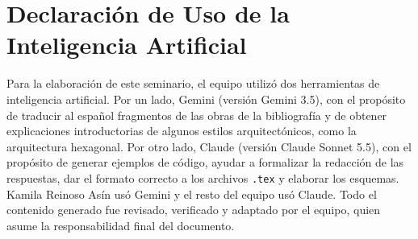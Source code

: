 \documentclass[12pt,a4paper]{article}
\begin{document}
\newpage
\printbibliography[title={Referencias}]

\section*{Declaración de Uso de la Inteligencia Artificial}

Para la elaboración de este seminario, el equipo utilizó dos herramientas de inteligencia artificial. Por un lado, Gemini (versión Gemini 3.5), con el propósito de traducir al español fragmentos de las obras de la bibliografía y de obtener explicaciones introductorias de algunos estilos arquitectónicos, como la arquitectura hexagonal. Por otro lado, Claude (versión Claude Sonnet 5.5), con el propósito de generar ejemplos de código, ayudar a formalizar la redacción de las respuestas, dar el formato correcto a los archivos \texttt{.tex} y elaborar los esquemas. Kamila Reinoso Asín usó Gemini y el resto del equipo usó Claude. Todo el contenido generado fue revisado, verificado y adaptado por el equipo, quien asume la responsabilidad final del documento.
\end{document}
